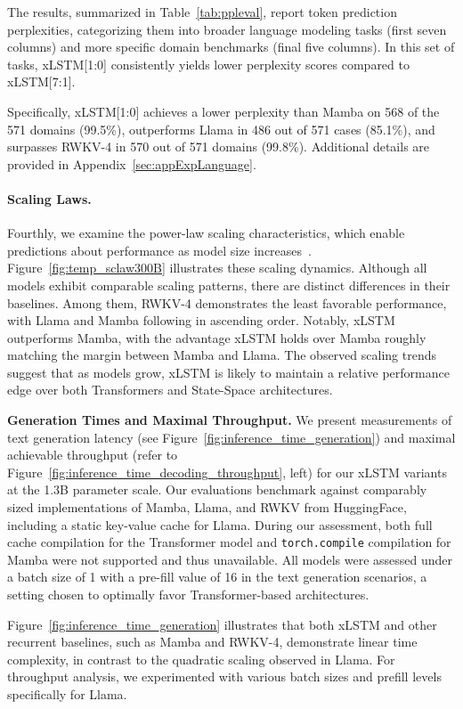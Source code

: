 The results, summarized in Table~\ref{tab:ppleval}, report token prediction perplexities, categorizing them into broader language modeling tasks (first seven columns) and more specific domain benchmarks (final five columns). In this set of tasks, xLSTM[1:0] consistently yields lower perplexity scores compared to xLSTM[7:1].

Specifically, xLSTM[1:0] achieves a lower perplexity than Mamba on 568 of the 571 domains (99.5\%), outperforms Llama in 486 out of 571 cases (85.1\%), and surpasses RWKV-4 in 570 out of 571 domains (99.8\%). Additional details are provided in Appendix~\ref{sec:appExpLanguage}.

\paragraph{Scaling Laws.} Fourthly, we examine the power-law scaling characteristics, which enable predictions about performance as model size increases~\citep{Kaplan:20,Brown:20short}. Figure~\ref{fig:temp_sclaw300B} illustrates these scaling dynamics. Although all models exhibit comparable scaling patterns, there are distinct differences in their baselines. Among them, RWKV-4 demonstrates the least favorable performance, with Llama and Mamba following in ascending order. Notably, xLSTM outperforms Mamba, with the advantage xLSTM holds over Mamba roughly matching the margin between Mamba and Llama. The observed scaling trends suggest that as models grow, xLSTM is likely to maintain a relative performance edge over both Transformers and State-Space architectures.

\textbf{Generation Times and Maximal Throughput.} We present measurements of text generation latency (see Figure~\ref{fig:inference_time_generation}) and maximal achievable throughput (refer to Figure~\ref{fig:inference_time_decoding_throughput}, left) for our xLSTM variants at the 1.3B parameter scale. Our evaluations benchmark against comparably sized implementations of Mamba, Llama, and RWKV from HuggingFace, including a static key-value cache for Llama. During our assessment, both full cache compilation for the Transformer model and \texttt{torch.compile} compilation for Mamba were not supported and thus unavailable. All models were assessed under a batch size of 1 with a pre-fill value of 16 in the text generation scenarios, a setting chosen to optimally favor Transformer-based architectures.

Figure~\ref{fig:inference_time_generation} illustrates that both xLSTM and other recurrent baselines, such as Mamba and RWKV-4, demonstrate linear time complexity, in contrast to the quadratic scaling observed in Llama. For throughput analysis, we experimented with various batch sizes and prefill levels specifically for Llama.

